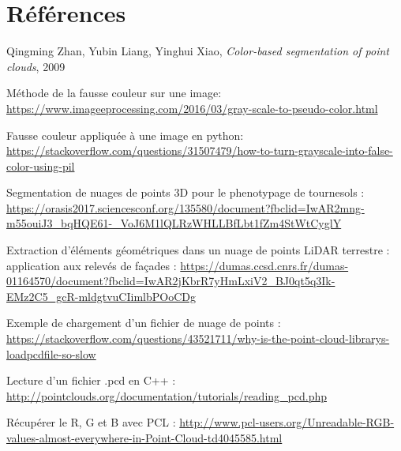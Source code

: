 \documentclass[12pt,titlepage,french]{article}
\newcounter{firstbib}
\begin{document}
\newpage

\section {Références}

\renewcommand{\refname}{Segmentation}
\begin{thebibliography}{3}
 Qingming Zhan, Yubin Liang, Yinghui Xiao, \textit{Color-based segmentation of point clouds}, 2009

\setcounter{firstbib}{\value{enumiv}}
\end{thebibliography}

\renewcommand{\refname}{Fausse couleur}
\begin{thebibliography}{3}
\setcounter{enumiv}{\value{firstbib}}


 Méthode de la fausse couleur sur une image:
\url{https://www.imageeprocessing.com/2016/03/gray-scale-to-pseudo-color.html}

 Fausse couleur appliquée à une image en python:
\url{https://stackoverflow.com/questions/31507479/how-to-turn-grayscale-into-false-color-using-pil}

\setcounter{firstbib}{\value{enumiv}}
\end{thebibliography}


\renewcommand{\refname}{C++}
\begin{thebibliography}{3}
\setcounter{enumiv}{\value{firstbib}}

 Segmentation de nuages de points 3D pour le phenotypage de tournesols :
\url{https://orasis2017.sciencesconf.org/135580/document?fbclid=IwAR2mng-m55ouiJ3_bqHQE61-_VoJ6M1lQLRzWHLLBfLbt1fZm4StWtCyglY}

 Extraction d'éléments géométriques dans un nuage de points LiDAR terrestre : application aux relevés de façades :
\url{https://dumas.ccsd.cnrs.fr/dumas-01164570/document?fbclid=IwAR2jKbrR7yHmLxiV2_BJ0qt5q3Ik-EMz2C5_gcR-mldgtvuCIimlbPOoCDg}

 Exemple de chargement d'un fichier de nuage de points :
\url{https://stackoverflow.com/questions/43521711/why-is-the-point-cloud-librarys-loadpcdfile-so-slow}

 Lecture d'un fichier .pcd en C++ :
\url{http://pointclouds.org/documentation/tutorials/reading_pcd.php}

 Récupérer le R, G et B avec PCL :
\url{http://www.pcl-users.org/Unreadable-RGB-values-almost-everywhere-in-Point-Cloud-td4045585.html}

\setcounter{firstbib}{\value{enumiv}}
\end{thebibliography}
\end{document}
